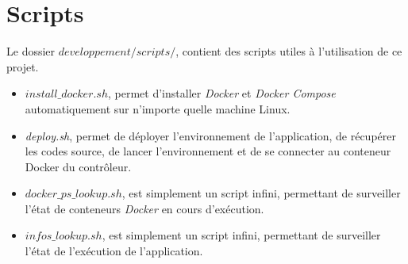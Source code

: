 \section{Scripts}

Le dossier \emph{$developpement/scripts/$}, contient des scripts utiles à l'utilisation de ce projet.

\begin{itemize}
\item \emph{$install\_docker.sh$}, permet d'installer \emph{Docker} et \emph{Docker Compose} automatiquement sur n'importe quelle machine Linux.
\item \emph{deploy.sh}, permet de déployer l'environnement de l'application, de récupérer les codes source, de lancer l'environnement et de se connecter au conteneur Docker du contrôleur.
\item \emph{$docker\_ps\_lookup.sh$}, est simplement un script infini, permettant de surveiller l'état de conteneurs \emph{Docker} en cours d'exécution.
\item \emph{$infos\_lookup.sh$}, est simplement un script infini, permettant de surveiller l'état de l'exécution de l'application.
\end{itemize}




























